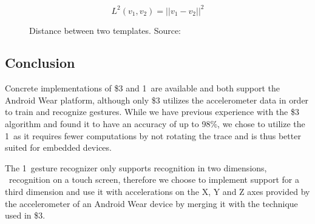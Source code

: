 \begin{figure}[h]
\[ L^{2}(v_1, v_2) = \lvert\lvert v_1 - v_2 \rvert\rvert^2 \]
\label{eq:one-cent-l-squared}
\caption{Distance between two templates. Source:~\cite{herold20121}}
\end{figure}

\subsection{Conclusion}

Concrete implementations of \$3 and 1\textcent~are available and both support the Android Wear platform, although only \$3 utilizes the accelerometer data in order to train and recognize gestures. While we have previous experience with the \$3 algorithm and found it to have an accuracy of up to 98\%, we chose to utilize the 1\textcent~as it requires fewer computations by not rotating the trace and is thus better suited for embedded devices.

The 1\textcent~gesture recognizer only supports recognition in two dimensions, \eg~recognition on a touch screen, therefore we choose to implement support for a third dimension and use it with accelerations on the X, Y and Z axes provided by the accelerometer of an Android Wear device by merging it with the technique used in \$3.

